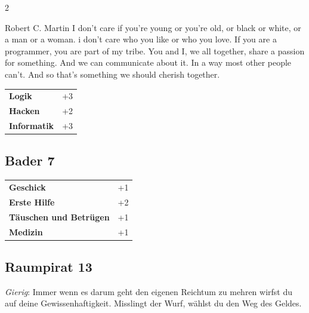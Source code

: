 \begin{multicols}{2}
\begin{tcolorbox}
\begin{pquote}{Robert C. Martin}
I don't care if you're young or you're old, or black or white, or a man or a woman. i don't care who you like or who you love. If you are a programmer, you are part of my tribe. You and I, we all together, share a passion for something. And we can communicate about it. In a way most other people can't. And so that's something we should cherish together.
\end{pquote}

\vspace{3mm}

\begin{tabular}{@{}ll@{}}
    \textbf{Logik} & +3\\
    \textbf{Hacken} & +2\\
    \textbf{Informatik} & +3\\
\end{tabular}


\end{tcolorbox}

\begin{tcolorbox}
    \subsection*{Bader \hfill \small{7 }}
    \tcblower




\begin{tabular}{@{}ll@{}}
    \textbf{Geschick} & +1\\
    \textbf{Erste Hilfe} & +2\\
    \textbf{Täuschen und Betrügen} & +1\\
    \textbf{Medizin} & +1\\
\end{tabular}


\end{tcolorbox}

\begin{tcolorbox}
    \subsection*{Raumpirat \hfill \small{13 }}
    \tcblower
\textit{Gierig}: Immer wenn es darum geht den eigenen Reichtum zu mehren wirfst du auf deine Gewissenhaftigkeit. Misslingt der Wurf, wählst du den Weg des Geldes.



\end{tcolorbox}
\end{multicols}
